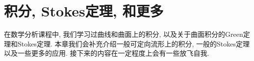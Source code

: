 \chapter{积分, Stokes定理, 和更多}\label{chapter_integration}
在数学分析课程中, 我们学习过曲线和曲面上的积分, 以及关于曲面积分的Green定理和Stokes定理.
本章我们会补充介绍一般可定向流形上的积分, 一般的Stokes定理以及一些更多的应用.
接下来的内容在一定程度上会有一些放飞自我.